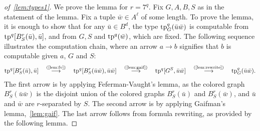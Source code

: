 \begin{proof}[of~\cref{lem:types1}]
We prove the lemma for $r=7^q$. 
Fix $G,A,B,S$  as in the statement of the lemma.
Fix a tuple $\bar w\in A^\ell$ of some length.
To prove the lemma, it is enough to show that
for any   $\bar u\in B^d$,
the type
$\mathrm{tp}^q_G(\bar u\bar w)$ is computable from $\mathrm{tp}^q[B^r_S(\bar u), \bar u]$,
and from 
$G,S$ and $\mathrm{tp}^q(\bar w)$, which are fixed.
The following sequence illustrates the computation chain,
where an arrow $a\rightarrow b$ signifies that $b$ is computable given $a$, $G$ and $S$:
\begin{align*}
	\mathrm{tp}^q[B^r_S(\bar u), \bar u]
  \quad\stackrel{\textrm{(\ref{lem:fv})}}{\longrightarrow}\quad
	\mathrm{tp}^q[B^r_S(\bar u\bar w), \bar u\bar w] \quad\stackrel{\textrm{(\ref{lem:gaif})}}\longrightarrow\quad
	\mathrm{tp}^q[G^S, \bar u\bar w] \quad\stackrel{\textrm{(\ref{lem:rewrite})}}\longrightarrow\quad
	\mathrm{tp}^q_G(\bar u\bar w).
\end{align*}
The first arrow is by applying Feferman-Vaught's lemma,
as the colored graph $B^r_S(\bar u\bar w)$
is the disjoint union of the colored graphs 
$B^r_S(\bar u)$ and $B^r_S(\bar w)$,
and $\bar u$ and $\bar w$ are $r$-separated by $S$.
The second arrow is by applying Gaifman's lemma,~\cref{lem:gaif}.
The last arrow follows from formula rewriting, as provided by the following lemma.


\end{proof}
